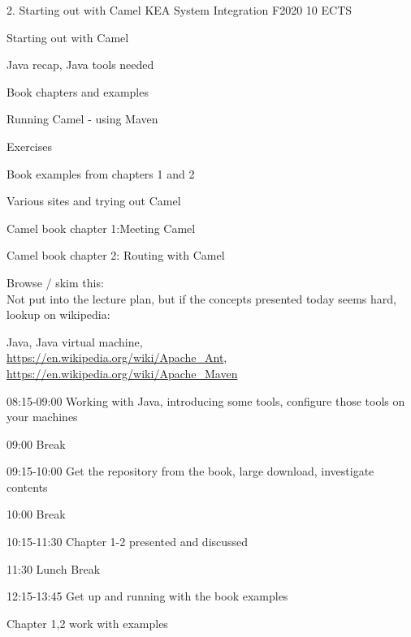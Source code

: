 \documentclass[Screen16to9,17pt]{foils}
\begin{document}
\mytitlepage
{2. Starting out with Camel}
{KEA System Integration F2020 10 ECTS}


Starting out with Camel
\begin{list2}
\item Java recap, Java tools needed
\item Book chapters and examples
\item Running Camel - using Maven
\end{list2}

Exercises
\begin{list2}
\item Book examples from chapters 1 and 2
\item Various sites and trying out Camel
\end{list2}




\begin{list1}
\item Camel book chapter 1:Meeting Camel
\item Camel book chapter 2: Routing with Camel
\item Browse / skim this:\\
Not put into the lecture plan, but if the concepts presented today seems hard, lookup on wikipedia:\\
\item Java, Java virtual machine,\\
 \url{https://en.wikipedia.org/wiki/Apache_Ant},\\ \url{https://en.wikipedia.org/wiki/Apache_Maven}
\end{list1}




\begin{list2}
\item 08:15-09:00 Working with Java, introducing some tools, configure those tools on your machines
\item 09:00 Break
\item 09:15-10:00 Get the repository from the book, large download, investigate contents
\item 10:00 Break 
\item 10:15-11:30 Chapter 1-2 presented and discussed
\item 11:30 Lunch Break
\item 12:15-13:45 Get up and running with the book examples
\item Chapter 1,2 work with examples
\end{list2}
\end{document}
